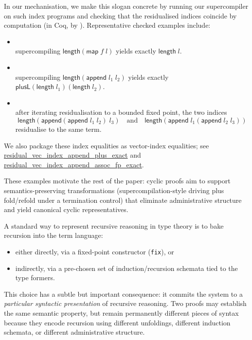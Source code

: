 In our mechanisation, we make this slogan concrete by running our supercompiler on such index programs and checking that the residualised indices coincide by computation (in Coq, by \texttt{}).
Representative checked examples include:
\begin{itemize}[leftmargin=*]
\item \texttt{}\\
  supercompiling \(\mathsf{length}(\mathsf{map}\;f\;l)\) yields exactly \(\mathsf{length}\;l\).
\item \texttt{}\\
  supercompiling \(\mathsf{length}(\mathsf{append}\;l_1\;l_2)\) yields exactly \(\mathsf{plusL}(\mathsf{length}\;l_1)(\mathsf{length}\;l_2)\).
\item \texttt{}\\
  after iterating residualisation to a bounded fixed point, the two indices
  \[
    \mathsf{length}(\mathsf{append}(\mathsf{append}\;l_1\;l_2)\;l_3)
    \quad\text{and}\quad
    \mathsf{length}(\mathsf{append}\;l_1(\mathsf{append}\;l_2\;l_3))
  \]
  residualise to the same term.
\end{itemize}
We also package these index equalities as vector-index equalities; see
\url{residual_vec_index_append_plus_exact} and
\url{residual_vec_index_append_assoc_fp_exact}.

These examples motivate the rest of the paper: cyclic proofs aim to support semantics-preserving transformations (supercompilation-style driving plus fold/refold under a termination control) that eliminate administrative structure and yield canonical cyclic representatives.

A standard way to represent recursive reasoning in type theory is to bake recursion into the term language:
\begin{itemize}
\item either directly, via a fixed-point constructor (\texttt{fix}), or
\item indirectly, via a pre-chosen set of induction/recursion schemata tied to the type formers.
\end{itemize}

This choice has a subtle but important consequence: it commits the system to a \emph{particular syntactic presentation} of recursive reasoning.
Two proofs may establish the same semantic property, but remain permanently different pieces of syntax because they encode recursion using different unfoldings, different induction schemata, or different administrative structure.

